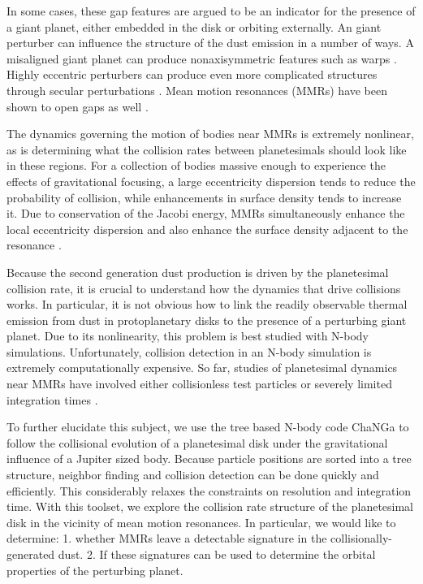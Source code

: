 \documentclass[twocolumn]{aastex63}
\begin{document}
In some cases, these gap features are argued to be an indicator for the presence of a giant planet, either embedded in the disk 
\citep{2015MNRAS.453L..73D} or orbiting externally. An giant perturber can influence the structure of the dust emission in a number 
of ways. A misaligned giant planet can produce nonaxisymmetric features such as warps \citep{2001A&A...370..447A}. Highly 
eccentric perturbers can produce even more complicated structures through secular perturbations \citep{2014MNRAS.443.2541P, 
2015MNRAS.448.3679P}. Mean motion resonances (MMRs) have been shown to open gaps as well
\citep{2015ApJ...798...83N, 2016ApJ...818..159T, 2018ApJ...857....3T}.

The dynamics governing the motion of bodies near MMRs is extremely nonlinear, as is determining what the collision rates between 
planetesimals should look like in these regions. For a collection of bodies massive enough to experience the effects of gravitational 
focusing, a large eccentricity dispersion tends to reduce the probability of collision, while enhancements in surface density tends to 
increase it. Due to conservation of the Jacobi energy, MMRs simultaneously enhance the local eccentricity dispersion and also 
enhance the surface density adjacent to the resonance \citep{2000Icar..143...45R, 2017ApJ...850..103B}.

Because the second generation dust production is driven by the planetesimal collision rate, it is crucial to understand how the 
dynamics that drive collisions works. In particular, it is not obvious how to link the readily observable thermal emission from dust in 
protoplanetary disks to the presence of a perturbing giant planet. Due to its nonlinearity, this problem is best studied with N-body 
simulations. Unfortunately, collision detection in an N-body simulation is extremely computationally expensive. So far, studies of 
planetesimal dynamics near MMRs have involved either collisionless test particles \citep{2017ApJ...850..103B, 2016ApJ...818..159T, 
2018ApJ...857....3T} or severely limited integration times \citep{2000Icar..143...45R}.

To further elucidate this subject, we use the tree based N-body code {\sc ChaNGa}
\citep{2008IEEEpds...ChaNGa, 2015AphCom..2..1} to follow the collisional evolution of a planetesimal disk under the gravitational 
influence of a Jupiter sized body. Because particle positions are sorted into a tree structure, neighbor finding and collision detection 
can be done quickly and efficiently. This considerably relaxes the constraints on resolution and integration time. With this toolset, we 
explore the collision rate structure of the planetesimal disk in the vicinity of mean motion resonances. In particular, we would like to 
determine: 1. whether MMRs leave a detectable signature in the collisionally-generated dust. 2. If these signatures can be used to determine the orbital properties of the perturbing planet.
\end{document}
